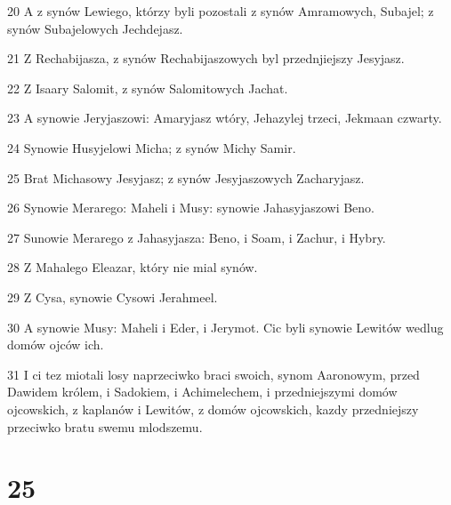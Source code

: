 \par 20 A z synów Lewiego, którzy byli pozostali z synów Amramowych, Subajel; z synów Subajelowych Jechdejasz.
\par 21 Z Rechabijasza, z synów Rechabijaszowych byl przednjiejszy Jesyjasz.
\par 22 Z Isaary Salomit, z synów Salomitowych Jachat.
\par 23 A synowie Jeryjaszowi: Amaryjasz wtóry, Jehazylej trzeci, Jekmaan czwarty.
\par 24 Synowie Husyjelowi Micha; z synów Michy Samir.
\par 25 Brat Michasowy Jesyjasz; z synów Jesyjaszowych Zacharyjasz.
\par 26 Synowie Merarego: Maheli i Musy: synowie Jahasyjaszowi Beno.
\par 27 Sunowie Merarego z Jahasyjasza: Beno, i Soam, i Zachur, i Hybry.
\par 28 Z Mahalego Eleazar, który nie mial synów.
\par 29 Z Cysa, synowie Cysowi Jerahmeel.
\par 30 A synowie Musy: Maheli i Eder, i Jerymot. Cic byli synowie Lewitów wedlug domów ojców ich.
\par 31 I ci tez miotali losy naprzeciwko braci swoich, synom Aaronowym, przed Dawidem królem, i Sadokiem, i Achimelechem, i przedniejszymi domów ojcowskich, z kaplanów i Lewitów, z domów ojcowskich, kazdy przedniejszy przeciwko bratu swemu mlodszemu.

\chapter{25}

